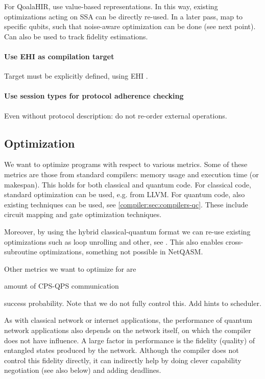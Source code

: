 For QoalaHIR, use value-based representations.
In this way, existing optimizations acting on SSA can be directly re-used.
In a later pass, map to specific qubits, such that noise-aware optimization can be done (see next point).
Can also be used to track fidelity estimations.

\paragraph{Use EHI as compilation target}
Target must be explicitly defined, using EHI .

\paragraph{Use session types for protocol adherence checking}
Even without protocol description: do not re-order external operations.

\subsection{Optimization}
We want to optimize programs with respect to various metrics.
Some of these metrics are those from standard compilers: memory usage and execution time (or makespan).
This holds for both classical and quantum code.
For classical code, standard optimization can be used, e.g. from LLVM.
For quantum code, also existing techniques can be used, see \cref{compiler:sec:compilers-qc}.
These include circuit mapping and gate optimization techniques.

Moreover, by using the hybrid classical-quantum format we can re-use existing optimizations such as loop unrolling and other, see \cite{mccaskey_mlir_2021, ittah_enabling_2022, nguyen_retargetable_2022, peduri_qssa_2022}.
This also enables cross-subroutine optimizations, something not possible in NetQASM.

Other metrics we want to optimize for are
\begin{inlinelist}
\item amount of CPS-QPS communication
\item success probability. Note that we do not fully control this. Add hints to scheduler.
\end{inlinelist}

As with classical network or internet applications, the performance of quantum network applications also depends on the network itself, on which the compiler does not have influence.
A large factor in performance is the fidelity (quality) of entangled states produced by the network.
Although the compiler does not control this fidelity directly, it can indirectly help by doing clever capability negotiation (see also below) and adding deadlines.

